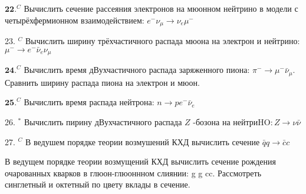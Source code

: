\documentclass[a4paper,12pt]{article} %
\begin{document}
\begin{ttask}

$\mathbf{2 2 .}^{C}$ Вычислить сечение рассеяния электронов на мюонном нейтрино
в модели с четырёхфермионном взаимодействием: $e^{-} \nu_{\mu} \rightarrow \nu_{e} \mu^{-}$


\end{ttask}



\begin{ttask}

23. $^{C}$ Вычислить ширину трёхчастичного распада мюона на электрон и нейтрино: $\mu^{-} \rightarrow e^{-} \bar{\nu}_{e} \nu_{\mu}$


\end{ttask}



\begin{ttask}

$\mathbf{2 4 .}^{C}$ Вычислить время дВухчастичного распада заряженного пиона:
$\pi^{-} \rightarrow \mu^{-} \bar{\nu}_{\mu} .$ Сравнить ширину распада пиона на электрон и мюон.



\end{ttask}



\begin{ttask}

$\mathbf{2 5 .}^{C}$ Вычислить время распада нейтрона: $n \rightarrow p e^{-} \bar{\nu}_{e}$


\end{ttask}



\begin{ttask}

26. $^{*}$ Вычислить пирину дВухчастичного распада $Z$ -бозона на нейтри$\mathrm{HO}: Z \rightarrow \nu \bar{\nu}$


\end{ttask}



\begin{ttask}

27. $^{C}$ В ведушем порядке теории возмушений КХД вычислить сечение
$\bar{q} q \rightarrow \bar{c} c$


\end{ttask}



\begin{ttask}

В ведущем порядке теории возмущений КХД вычислить сечение рождения очарованных кварков в глюон-глюоннном слиянии: g g  cc. Рассмотреть синглетный и октетный по цвету вклады в сечение. 


\end{ttask}




\printindex



\end{document}
